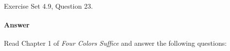 \documentclass{article}
\begin{document}
\collab{\todo{}}

Exercise Set 4.9, Question 23.

\paragraph{Answer}


\collab{\todo{}}
Read Chapter 1 of \emph{Four Colors Suffice} and answer the following questions:
\end{document}

